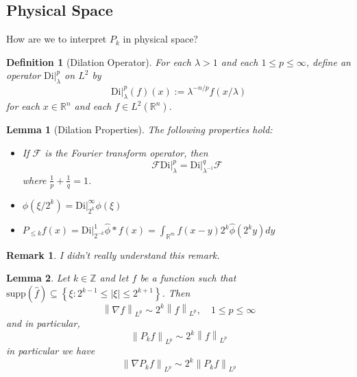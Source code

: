 \documentclass{article}
\newtheorem{definition}{Definition}
\newtheorem{lemma}{Lemma}
\newtheorem{remark}{Remark}
\def\R{\mathbb{R}} %
\def\Z{\mathbb{Z}} %
\newcommand{\di}{\left. \mathrm{Di} \right|}
\newcommand\norm[1]{\left\lVert#1\right\rVert}
\begin{document}
\subsection{Physical Space}
How are we to interpret $P_{k}$ in physical space?
\begin{definition}[Dilation Operator]
  \label{def:dilation-operator}
  For each $\lambda>1$ and each $1 \leq p \leq \infty$, define an operator
  $\di_{\lambda}^{p}$ on $L^{2}$ by
  \begin{equation*}
    \di_{\lambda}^{p}(f)(x):= \lambda^{-n/p}f(x/\lambda)
  \end{equation*}
  for each $x\in \R^n$ and each $f\in L^{2}(\R^n)$. 
\end{definition}
\begin{lemma}[Dilation Properties]
  \label{lem:dilation-properties}
  The following properties hold:
  \begin{itemize}
    \item If $\mathcal{F}$ is the Fourier transform operator, then
    \begin{equation*}
      \mathcal{F}\di_{\lambda}^{p} = \di_{\lambda^{-1}}^{q}\mathcal{F}
    \end{equation*}
    where $\frac{1}{p}+\frac{1}{q}=1$.
    \item $\phi(\xi/2^{k})= \di_{2^{k}}^{\infty}\phi(\xi)$ 
    \item $P_{\leq k}f(x)=\di_{2^{-k}}^{1}\hat{\phi}*f(x) = \int_{\R^m}f(x-y)2^{k}\hat{\phi}(2^{k}y)dy $
  \end{itemize}
\end{lemma}
\begin{remark}
  I didn't really understand this remark. 
\end{remark}
\begin{lemma}
  \label{lem:littlewood-paley-Lp-lemma}
  Let $k\in \Z$ and let $f$ be a function such that
  $\text{supp}(\hat{f}) \subseteq \left\{\xi: 2^{k-1}\leq |\xi| \leq
    2^{k+1}\right\}$. Then
  \begin{equation*}
    \norm{\nabla f}_{L^{p}} \sim 2^{k} \norm{f}_{L^{p}}, \quad 1 \leq  p\leq \infty
  \end{equation*}
  and in particular,
  \begin{equation*}
    \norm{P_{k}f}_{L^{p}} \sim 2^{k} \norm{f}_{L^{p}}
  \end{equation*}
  in particular we have
  \begin{equation}\label{eq:8}
    \norm{\nabla P_{k}f}_{L^{p}} \sim 2^{k} \norm{P_{k}f}_{L^{p}}
  \end{equation}
\end{lemma}
\end{document}
